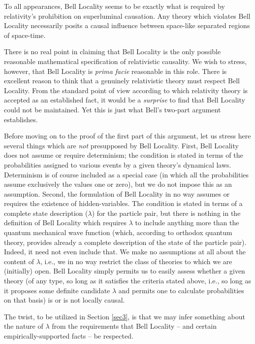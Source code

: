\documentclass[aps,prc,onecolumn,12pt,nofootinbib]{revtex4-2}
\begin{document}
To all appearances, Bell Locality seems
to be exactly what is required by relativity's prohibition on
superluminal causation.  Any theory which violates Bell Locality
necessarily posits a causal influence between space-like separated
regions of space-time.

There is no real point in claiming that Bell Locality is the only
possible reasonable mathematical specification of relativistic
causality.  We wish to stress,
however, that Bell Locality is \emph{prima facie} reasonable
in this role.
There is excellent reason to think that a genuinely relativistic
theory must respect Bell Locality.
From the standard point of view according to which relativity theory
is accepted as an established fact, it would be a
\emph{surprise} to find that Bell Locality could not be maintained.
Yet this is just what Bell's two-part argument establishes.

Before moving on to the proof of the first part of this argument,
let us stress here several
things which are \emph{not} presupposed by Bell Locality.  First,
Bell Locality does not assume or require determinism; the condition
is stated in terms of the probabilities assigned to various events
by a given
theory's dynamical laws.  Determinism is of course included as a
special case (in which all the probabilities assume exclusively the
values one or zero), but we do not impose this as an assumption.
Second, the formulation of Bell Locality in no way assumes or requires
the existence of hidden-variables.  The condition is stated in terms of a
complete state description ($\lambda$) for the particle pair, but
there is nothing in the definition of Bell Locality which requires
$\lambda$ to include anything more than the quantum mechanical wave
function (which, according to orthodox quantum theory, provides
already a complete description of the state of the particle pair).
Indeed, it need not even include that.  We make no
assumptions at all about the content of $\lambda$, i.e., we in no way
restrict the class of theories to which we are (initially) open.
Bell Locality simply permits us to easily assess whether a
given theory (of any type, so long as it satisfies the criteria stated
above, i.e., so long as it proposes some definite
candidate $\lambda$ and permits one to calculate probabilities on
that basis) is or is not locally causal.

The twist, to be utilized in Section \ref{sec3}, is that we may
infer something about the nature of $\lambda$ from the requirements
that Bell Locality -- and certain empirically-supported facts -- be
respected.
\end{document}
